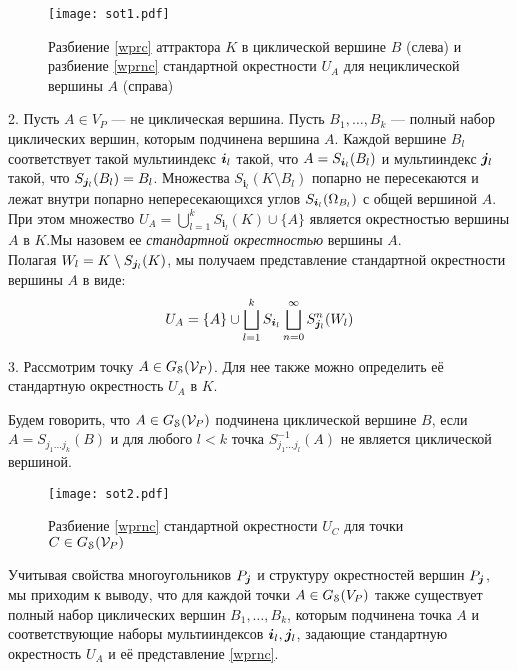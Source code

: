 \begin{figure}[H]
    \centering
    \texttt{[image: sot1.pdf]}
    \caption{Разбиение \eqref{wprc} аттрактора $K$ в циклической вершине $B$ (слева) и разбиение \eqref{wprnc} стандартной окрестности $U_A$  для нециклической вершины $A$ (справа)}
    \label{img:sot1}
\end{figure}

2. Пусть $A\in V_P$ --- не циклическая вершина. 
Пусть $B_1, \ldots, B_k$ --- полный набор циклических вершин, которым подчинена вершина $A$.
Каждой вершине $B_l$ соответствует такой мультииндекс  ${\bm{i}}_l$ такой, что $A=S_{{\bm{i}}_l}(B_l)$ и мультииндекс ${\bm{j}}_l$ такой, что $S_{{\bm{j}}_l}(B_l)=B_l$. 
Множества $ S_{\bm{i}_l}(K\setminus B_l)$ попарно не пересекаются и лежат   внутри попарно непересекающихся углов $S_{{\bm{i}}_l}(\Omega_{B_l})$ с общей вершиной $A$. 
При этом множество $U_A=\bigcup\limits_{l=1}^k S_{\bm{i}_l}(K)\cup\{A\}$ является окрестностью вершины $A$ в $K$.Мы назовем ее {\em стандартной окрестностью} вершины $A$.\\
Полагая $W_l=K\setminus S_{{\bm{j}}_l}(K)$, мы получаем представление стандартной окрестности вершины $A$ в виде:
\begin{equation} \label{wprnc} 
U_A=\{A\}\cup\bigsqcup\limits_{l=1}^k S_{{\bm{i}}_l}\bigsqcup\limits_{n=0}^\infty S_{{\bm{j}}_l}^n(W_l)
\end{equation}

3. Рассмотрим точку $A\in G_{\EuScript S} ({\mathcal V}_P)$. 
Для нее также можно определить её стандартную окрестность $U_A$ в $K$.

\begin{definition}
Будем говорить, что $A\in G_{\EuScript S} ({\mathcal V}_P)$ подчинена циклической вершине $B$, если $A=S_{j_1...j_k}(B)$ и
 для любого $l<k$ точка $S_{j_1...j_l}^{-1}(A)$ не является циклической вершиной. 
\end{definition}

\begin{figure}[H]
    \centering
    \texttt{[image: sot2.pdf]}
    \caption{Разбиение \eqref{wprnc} стандартной окрестности $U_C$  для точки $C\in G_{\EuScript S} ({\mathcal V}_P)$}
    \label{img:sot2}
\end{figure}

Учитывая свойства многоугольников $P_{\bm{j}}$ и структуру окрестностей вершин $P_{\bm{j}}$, мы приходим к выводу, что для каждой точки $A\in G_{\EuScript S} (V_P)$ также существует полный набор циклических вершин $B_1, \ldots, B_k$, которым подчинена точка $A$ и соответствующие наборы мультииндексов ${\bm{i}}_l, {\bm{j}}_l$, задающие  стандартную окрестность $U_A$ и её представление \eqref{wprnc}.





